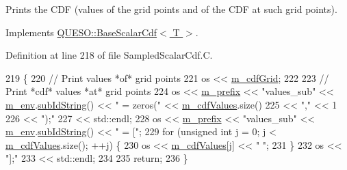 Prints the C\-D\-F (values of the grid points and of the C\-D\-F at such grid points). 



Implements \hyperlink{class_q_u_e_s_o_1_1_base_scalar_cdf_a131a7c148188f3f70c2db44cc1a93bc8}{Q\-U\-E\-S\-O\-::\-Base\-Scalar\-Cdf$<$ T $>$}.



Definition at line 218 of file Sampled\-Scalar\-Cdf.\-C.


\begin{DoxyCode}
219 \{
220   \textcolor{comment}{// Print values *of* grid points}
221   os << \hyperlink{class_q_u_e_s_o_1_1_sampled_scalar_cdf_a58d6744bac9ce8d906839bf381517f4a}{m\_cdfGrid};
222 
223   \textcolor{comment}{// Print *cdf* values *at* grid points}
224   os << \hyperlink{class_q_u_e_s_o_1_1_base_scalar_cdf_a66c2a1bcf0ac517013e7857c3533a187}{m\_prefix} << \textcolor{stringliteral}{"values\_sub"} << \hyperlink{class_q_u_e_s_o_1_1_base_scalar_cdf_a3caa986ae1ccef96a28b0365fb88c86c}{m\_env}.\hyperlink{class_q_u_e_s_o_1_1_base_environment_a73f7849acdd5d5ba15a3094fe18f258f}{subIdString}() << \textcolor{stringliteral}{" = zeros("} << 
      \hyperlink{class_q_u_e_s_o_1_1_sampled_scalar_cdf_ab8cf649637f31cc75c9f676d5927c10f}{m\_cdfValues}.size()
225      << \textcolor{stringliteral}{","}                                                            << 1
226      << \textcolor{stringliteral}{");"}
227      << std::endl;
228   os << \hyperlink{class_q_u_e_s_o_1_1_base_scalar_cdf_a66c2a1bcf0ac517013e7857c3533a187}{m\_prefix} << \textcolor{stringliteral}{"values\_sub"} << \hyperlink{class_q_u_e_s_o_1_1_base_scalar_cdf_a3caa986ae1ccef96a28b0365fb88c86c}{m\_env}.\hyperlink{class_q_u_e_s_o_1_1_base_environment_a73f7849acdd5d5ba15a3094fe18f258f}{subIdString}() << \textcolor{stringliteral}{" = ["};
229   \textcolor{keywordflow}{for} (\textcolor{keywordtype}{unsigned} \textcolor{keywordtype}{int} j = 0; j < \hyperlink{class_q_u_e_s_o_1_1_sampled_scalar_cdf_ab8cf649637f31cc75c9f676d5927c10f}{m\_cdfValues}.size(); ++j) \{
230     os << \hyperlink{class_q_u_e_s_o_1_1_sampled_scalar_cdf_ab8cf649637f31cc75c9f676d5927c10f}{m\_cdfValues}[j] << \textcolor{stringliteral}{" "};
231   \}
232   os << \textcolor{stringliteral}{"];"}
233      << std::endl;
234 
235   \textcolor{keywordflow}{return};
236 \}
\end{DoxyCode}
